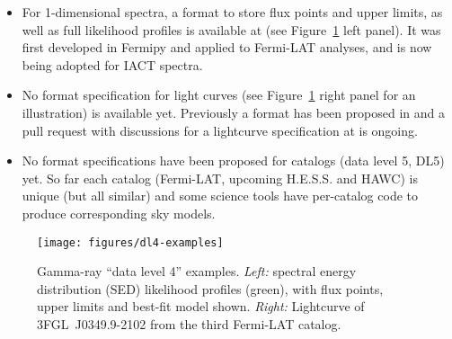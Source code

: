 \begin{itemize}
\item{} For 1-dimensional spectra, a format to store flux points and upper limits, as well as full likelihood profiles is available at \gadf (see Figure~\ref{fig:dl4-examples} left panel). It was first developed in Fermipy and applied to Fermi-LAT analyses, and is now being adopted for IACT spectra.
\item{} No format specification for light curves (see Figure~\ref{fig:dl4-examples} right panel for an illustration) is available yet. Previously a format has been proposed in \cite{2010AnA...524A..48T} and a pull request with discussions for a lightcurve specification at \gadf is ongoing.
\item{} No format specifications have been proposed for catalogs (data level 5, DL5) yet. So far each catalog (Fermi-LAT, upcoming H.E.S.S. and HAWC) is unique (but all similar) and some science tools have per-catalog code to produce corresponding sky models. %
\end{itemize}

\begin{figure}[tb]
\centerline{\texttt{[image: figures/dl4-examples]}}
\caption{
Gamma-ray ``data level 4'' examples. \emph{Left:} spectral energy distribution (SED) likelihood profiles (green), with flux points, upper limits and best-fit model shown. \emph{Right:} Lightcurve of 3FGL~J0349.9-2102 from the third Fermi-LAT catalog.
}
\label{fig:dl4-examples}
\end{figure}
